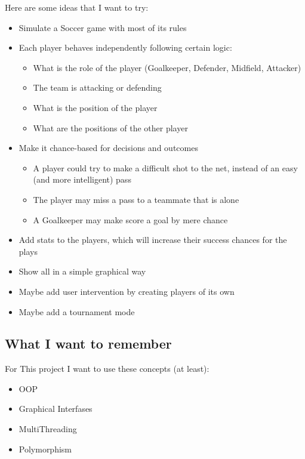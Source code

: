 \documentclass{article}
\theoremstyle{mytheoremstyle}
\theoremstyle{mytheoremstyle}
\theoremstyle{myproblemstyle}
\begin{document}
    Here are some ideas that I want to try:
    \begin{itemize}
        \item Simulate a Soccer game with most of its rules
        \item Each player behaves independently following certain logic:
        \begin{itemize}
            \item What is the role of the player (Goalkeeper, Defender, Midfield, Attacker)
            \item The team is attacking or defending
            \item What is the position of the player
            \item What are the positions of the other player 
        \end{itemize}
        \item Make it chance-based for decisions and outcomes
        \begin{itemize}
            \item A player could try to make a difficult shot to the net, instead of an easy (and more intelligent) pass
            \item The player may miss a pass to a teammate that is alone
            \item A Goalkeeper may make score a goal by mere chance
        \end{itemize}
        \item Add stats to the players, which will increase their success chances for the plays
        \item Show all in a simple graphical way
        \item Maybe add user intervention by creating players of its own
        \item Maybe add a tournament mode
    \end{itemize}

    \subsection{What I want to remember}
    For This project I want to use these concepts (at least):
    \begin{itemize}
        \item OOP
        \item Graphical Interfases
        \item MultiThreading
        \item Polymorphism
    \end{itemize}
    
\end{document}
